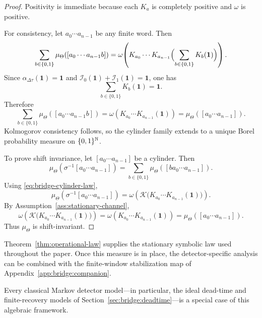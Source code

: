 \begin{proof}
Positivity is immediate because each $K_a$ is completely positive and $\omega$ is positive.

For consistency, let $a_0\cdots a_{n-1}$ be any finite word. Then
\[
\sum_{b\in\{0,1\}}
\mu_\Theta([a_0\cdots a_{n-1}b])
=
\omega\!\left(
K_{a_0}\cdots K_{a_{n-1}}
\Bigl(\sum_{b\in\{0,1\}}K_b(\mathbf 1)\Bigr)
\right).
\]
Since $\alpha_{\Delta\tau}(\mathbf 1)=\mathbf 1$ and $\mathcal I_0(\mathbf 1)+\mathcal I_1(\mathbf 1)=\mathbf 1$, one has
\[
\sum_{b\in\{0,1\}}K_b(\mathbf 1)=\mathbf 1.
\]
Therefore
\[
\sum_{b\in\{0,1\}}
\mu_\Theta([a_0\cdots a_{n-1}b])
=
\omega\!\left(
K_{a_0}\cdots K_{a_{n-1}}(\mathbf 1)
\right)
=
\mu_\Theta([a_0\cdots a_{n-1}]).
\]
Kolmogorov consistency follows, so the cylinder family extends to a unique Borel probability measure on $\{0,1\}^{\mathbb{N}}$.

To prove shift invariance, let $[a_0\cdots a_{n-1}]$ be a cylinder. Then
\[
\mu_\Theta(\sigma^{-1}[a_0\cdots a_{n-1}])
=
\sum_{b\in\{0,1\}}
\mu_\Theta([ba_0\cdots a_{n-1}]).
\]
Using \eqref{eq:bridge-cylinder-law},
\[
\mu_\Theta(\sigma^{-1}[a_0\cdots a_{n-1}])
=
\omega\!\left(
\mathcal K\bigl(K_{a_0}\cdots K_{a_{n-1}}(\mathbf 1)\bigr)
\right).
\]
By Assumption~\ref{ass:stationary-channel},
\[
\omega\!\left(
\mathcal K\bigl(K_{a_0}\cdots K_{a_{n-1}}(\mathbf 1)\bigr)
\right)
=
\omega\!\left(
K_{a_0}\cdots K_{a_{n-1}}(\mathbf 1)
\right)
=
\mu_\Theta([a_0\cdots a_{n-1}]).
\]
Thus $\mu_\Theta$ is shift-invariant.
\end{proof}

\begin{remark}\label{rem:bridge-entry}
Theorem~\ref{thm:operational-law} supplies the stationary symbolic law used throughout the paper. Once this measure is in place, the detector-specific analysis can be combined with the finite-window stabilization map of Appendix~\ref{app:bridge:companion}.
\end{remark}

Every classical Markov detector model---in particular, the ideal dead-time and finite-recovery models of Section~\ref{sec:bridge:deadtime}---is a special case of this algebraic framework.

